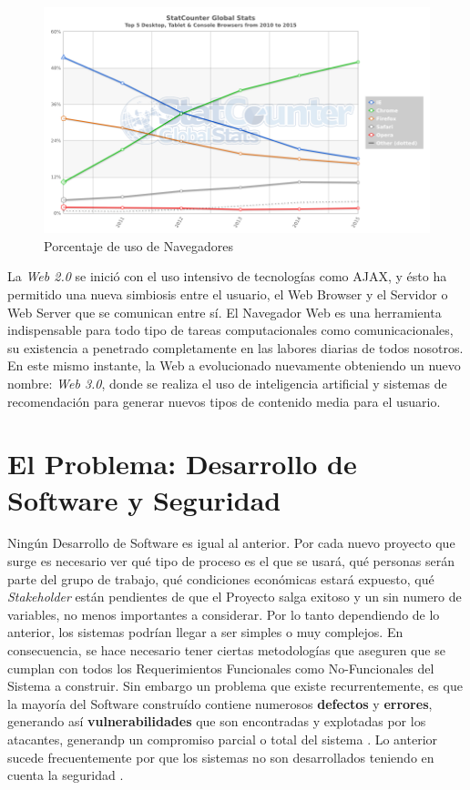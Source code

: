     \begin{figure}[h]
        \centering
        \includegraphics[width=1\textwidth]{figures/StatCounter-browser-ww-yearly-2010-2015.png}
        \caption{Porcentaje de uso de Navegadores \cite{statBrow}}
        \label{fig:UsageShare}
    \end{figure}

La \textit{Web 2.0} se inició con el uso intensivo de tecnologías como AJAX, y ésto ha permitido una nueva simbiosis entre el usuario, el Web Browser y el Servidor o Web Server que se comunican entre sí. El Navegador Web es una herramienta indispensable para todo tipo de tareas computacionales como comunicacionales, su existencia a penetrado completamente en las labores diarias de todos nosotros. En este mismo instante, la Web a evolucionado nuevamente obteniendo un nuevo nombre: \textit{Web 3.0}, donde se realiza el uso de inteligencia artificial y sistemas de recomendación para generar nuevos tipos de contenido media para el usuario.


\section{El Problema: Desarrollo de Software y Seguridad}
\label{chap1:SD_SS}

Ningún Desarrollo de Software es igual al anterior. Por cada nuevo proyecto que surge es necesario ver qué tipo de proceso es el que se usará, qué personas serán parte del grupo de trabajo, qué condiciones económicas estará expuesto, qué \textit{Stakeholder} están pendientes de que el Proyecto salga exitoso y un sin numero de variables, no menos importantes a considerar. Por lo tanto dependiendo de lo anterior, los sistemas podrían llegar a ser simples o muy complejos. En consecuencia, se hace necesario tener ciertas metodologías que aseguren que se cumplan con todos los Requerimientos Funcionales como No-Funcionales del Sistema a construir. Sin embargo un problema que existe recurrentemente, es que la mayoría del Software construído contiene numerosos \textbf{defectos} y \textbf{errores}, generando así \textbf{vulnerabilidades} que son encontradas y explotadas por los atacantes, generandp un compromiso parcial o total del sistema \cite{goertzel2007software}. Lo anterior sucede frecuentemente por que los sistemas no son desarrollados teniendo en cuenta la seguridad \cite{Yoder1998, fernandez2004methodology, WhyteHarrison}.


